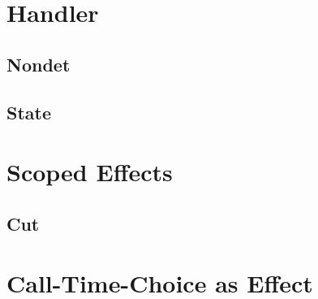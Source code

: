 \section{Handler}

\subsection{Nondet}
\subsection{State}

\section{Scoped Effects}
\subsection{Cut}

\section{Call-Time-Choice as Effect}
